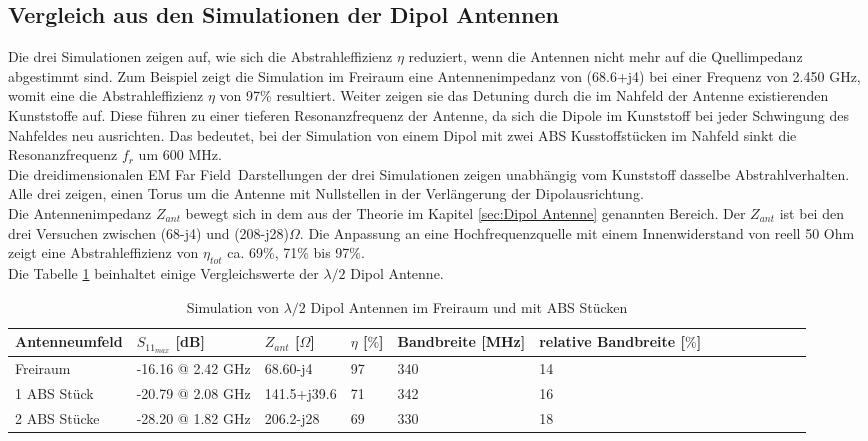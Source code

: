 \subsection{Vergleich aus den Simulationen der Dipol Antennen}
Die drei Simulationen zeigen auf, wie sich die Abstrahleffizienz $\eta$ reduziert, wenn die Antennen nicht mehr auf die Quellimpedanz abgestimmt sind. Zum Beispiel zeigt die Simulation im Freiraum eine Antennenimpedanz von (68.6+j4) bei einer Frequenz von 2.450 GHz, womit eine die Abstrahleffizienz $\eta$ von 97$\%$ resultiert. Weiter zeigen sie das Detuning durch die im Nahfeld der Antenne existierenden Kunststoffe auf. Diese führen zu einer tieferen Resonanzfrequenz der Antenne, da sich die Dipole im Kunststoff bei jeder Schwingung des Nahfeldes neu ausrichten. Das bedeutet, bei der Simulation von einem Dipol mit zwei ABS Kusstoffstücken im Nahfeld sinkt die Resonanzfrequenz $f_{r}$ um 600 MHz.\\ 
Die dreidimensionalen \glqq EM Far Field\grqq \ Darstellungen der drei Simulationen zeigen unabhängig vom Kunststoff dasselbe Abstrahlverhalten. Alle drei zeigen, einen Torus um die Antenne mit Nullstellen in der Verlängerung der Dipolausrichtung.\\
Die Antennenimpedanz $Z_{ant}$ bewegt sich in dem aus der Theorie im Kapitel \ref{sec:Dipol Antenne} genannten Bereich. Der $Z_{ant}$ ist bei den drei Versuchen zwischen (68-j4) und (208-j28)$\Omega$. Die Anpassung an eine Hochfrequenzquelle mit einem Innenwiderstand von reell 50 Ohm zeigt eine Abstrahleffizienz von $\eta_{tot}$ ca. 69\%, 71\% bis 97\%.\\
Die Tabelle \ref{tab:Evaluation_Vergeich_Dipol Antennen} beinhaltet einige Vergleichswerte der $\lambda/2$ Dipol Antenne.
\begin{table}[!h]
 \centering
 \begin{tabular}{p{3cm} p{4cm} p{2cm} p{1.5cm} p{2cm} p{2.5cm} l c c c c p r} 
 \toprule 
 Antenneumfeld & $S_{11_{max}}$ [dB]		& $Z_{ant}$ [$\Omega$] 	& $\eta$ [$\%$] & Bandbreite [MHz] & relative Bandbreite [$\%$]\\ 
 \midrule
 Freiraum 			&	-16.16 @ 2.42 GHz		& 	68.60-j4			& 	97	&	340 & 14\\ 		
1 ABS Stück 	& -20.79 @ 2.08 GHz 		&	141.5+j39.6		&	71	&	342	 & 16 \\
2 ABS Stücke 	& -28.20 @ 1.82 GHz 	&	206.2-j28		&	69	&	330	 & 18 \\
 \bottomrule
 \end{tabular}
 \caption{Simulation von $\lambda/2$ Dipol Antennen im Freiraum und mit ABS Stücken}
 \label{tab:Evaluation_Vergeich_Dipol Antennen}
\end{table}

